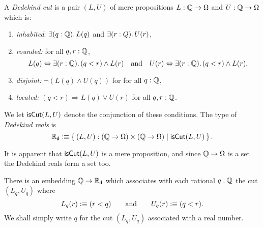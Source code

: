 \begin{defn} \label{defn:dedekind-reals}
  A \emph{Dedekind cut} is a pair $(L, U)$ of mere propositions $L : \mathbb{Q} \to \Omega$ and $U
  : \mathbb{Q} \to \Omega$ which is:
  \begin{enumerate}
  \item \emph{inhabited}: $\exis{q : \Q} L(q)$ and $\exis{r : Q} U(r)$,
  \item \emph{rounded:} for all $q, r : \mathbb{Q}$,
    \begin{equation*}
      L(q) \Leftrightarrow \exis{r : \Q} (q < r) \land L(r)
      \quad\text{and}\quad
      U(r) \Leftrightarrow \exis{r : \Q} (q < r) \land L(r),
    \end{equation*}
  \item \emph{disjoint:} $\lnot (L(q) \land U(q))$ for for all $q : \mathbb{Q}$,
  \item \emph{located:} $(q < r) \Rightarrow L(q) \lor U(r)$ for all $q, r : \mathbb{Q}$.
  \end{enumerate}
  We let $\mathsf{isCut}(L, U)$ denote the conjunction of these conditions. The type of
  \emph{Dedekind reals} is
  \begin{equation*}
    \RD \defeq \setof{ (L, U) : (\Q \to \Omega) \times (\Q \to \Omega) | \dcut(L,U)}.
  \end{equation*}
\end{defn}

It is apparent that $\mathsf{isCut}(L, U)$ is a mere proposition, and since $\mathbb{Q} \to \Omega$ is a set
the Dedekind reals form a set too. 

There is an embedding $\mathbb{Q} \to \mathbb{R}_\mathsf{d}$ which associates with each rational $q : \mathbb{Q}$ the cut
$(L_q, U_q)$ where
%
\begin{equation*}
  L_q(r) \vcentcolon\equiv (r < q)
  \qquad\text{and}\qquad
  U_q(r) \vcentcolon\equiv (q < r).
\end{equation*}
%
We shall simply write $q$ for the cut $(L_q, U_q)$ associated with a real number.

